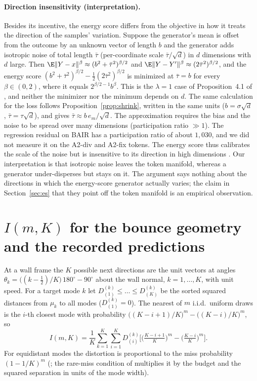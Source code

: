 \paragraph{Direction insensitivity (interpretation).} Besides its incentive, the energy score differs from the \nom{} objective in how it treats the direction of the samples' variation. Suppose the generator's mean is offset from the outcome by an unknown vector of length $b$ and the generator adds isotropic noise of total length $\bar\tau$ (per-coordinate scale $\bar\tau/\sqrt{d}$) in $d$ dimensions with $d$ large. Then $\E\|Y - x\|^\beta \approx (b^2 + \bar\tau^2)^{\beta/2}$ and $\E\|Y - Y'\|^\beta \approx (2 \bar\tau^2)^{\beta/2}$, and the energy score $(b^2 + \bar\tau^2)^{\beta/2} - \frac{1}{2}(2\bar\tau^2)^{\beta/2}$ is minimized at $\bar\tau = b$ for every $\beta \in (0, 2)$, where it equals $2^{\beta/2 - 1} b^\beta$. This is the $\lambda = 1$ case of Proposition~4.1 of \citet{debortoli2025distributional}, and neither the minimizer nor the minimum depends on $d$. The same calculation for the \nom{} loss follows Proposition~\ref{prop:shrink}, written in the same units ($b = \sigma\sqrt{d}$, $\bar\tau = \tau\sqrt{d}$), and gives $\bar\tau \approx b\, e_m/\sqrt{d}$. The approximation requires the bias and the noise to be spread over many dimensions (participation ratio $\gg 1$). The regression residual on BAIR has a participation ratio of about $1{,}030$, and we did not measure it on the A2-div and A2-fix tokens. The energy score thus calibrates the scale of the noise but is insensitive to its direction in high dimensions \citep{chakraborty2021framework,pinson2013discrimination,scheuerer2015variogram,marcotte2023regions}. Our interpretation is that isotropic noise leaves the token manifold, whereas a \nom{} generator under-disperses but stays on it. The argument says nothing about the directions in which the energy-score generator actually varies; the claim in Section~\ref{sec:es} that they point off the token manifold is an empirical observation.

\FloatBarrier
\section{$I(m,K)$ for the bounce geometry and the recorded predictions}
\label{app:pred}
\label{app:imk}
At a wall frame the $K$ possible next directions are the unit vectors at angles $\theta_k = \big((k - \tfrac12)/K\big)\,180^\circ - 90^\circ$ about the wall normal, $k = 1, \dots, K$, with unit speed. For a target mode $k$ let $D^{(k)}_{(1)} \le \dots \le D^{(k)}_{(K)}$ be the sorted squared distances from $\mu_k$ to all modes ($D^{(k)}_{(1)} = 0$). The nearest of $m$ i.i.d.\ uniform draws is the $i$-th closest mode with probability $\big((K - i + 1)/K\big)^m - \big((K - i)/K\big)^m$, so
\begin{equation*}
I(m, K) = \frac{1}{K} \sum_{k=1}^{K} \sum_{i=1}^{K} D^{(k)}_{(i)} \Big[ \big(\tfrac{K - i + 1}{K}\big)^m - \big(\tfrac{K - i}{K}\big)^m \Big].
\end{equation*}
For equidistant modes the distortion is proportional to the miss probability $(1-1/K)^m$ (\citealp[Theorem~3]{bennett2026freedom}; the rare-miss condition of \citealp[Prop.~3]{gladstone2026xm} multiplies it by the budget and the squared separation in units of the mode width).
